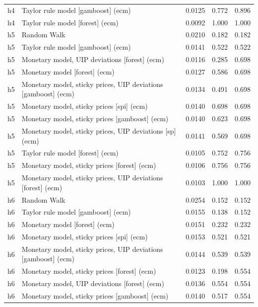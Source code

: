 \begin{ThreePartTable}
\begin{longtable}[t]{cp{5.5cm}ccc}
h4 & \raggedright Taylor rule model [gamboost] (ecm) & 0.0125 & 0.772 & 0.896\\
h4 & \raggedright Taylor rule model [forest] (ecm) & 0.0092 & 1.000 & 1.000\\
\addlinespace
h5 & \raggedright Random Walk & 0.0210 & 0.182 & 0.182\\
h5 & \raggedright Taylor rule model [gamboost] (ecm) & 0.0141 & 0.522 & 0.522\\
h5 & \raggedright Monetary model, UIP deviations [forest] (ecm) & 0.0116 & 0.285 & 0.698\\
h5 & \raggedright Monetary model [forest] (ecm) & 0.0127 & 0.586 & 0.698\\
h5 & \raggedright Monetary model, sticky prices, UIP deviations [gamboost] (ecm) & 0.0134 & 0.491 & 0.698\\
h5 & \raggedright Monetary model, sticky prices [spi] (ecm) & 0.0140 & 0.698 & 0.698\\
h5 & \raggedright Monetary model, sticky prices [gamboost] (ecm) & 0.0140 & 0.623 & 0.698\\
h5 & \raggedright Monetary model, sticky prices, UIP deviations [sp] (ecm) & 0.0141 & 0.569 & 0.698\\
h5 & \raggedright Taylor rule model [forest] (ecm) & 0.0105 & 0.752 & 0.756\\
h5 & \raggedright Monetary model, sticky prices [forest] (ecm) & 0.0106 & 0.756 & 0.756\\
h5 & \raggedright Monetary model, sticky prices, UIP deviations [forest] (ecm) & 0.0103 & 1.000 & 1.000\\
\addlinespace
h6 & \raggedright Random Walk & 0.0254 & 0.152 & 0.152\\
h6 & \raggedright Taylor rule model [gamboost] (ecm) & 0.0155 & 0.138 & 0.152\\
h6 & \raggedright Monetary model [forest] (ecm) & 0.0151 & 0.232 & 0.232\\
h6 & \raggedright Monetary model, sticky prices [spi] (ecm) & 0.0153 & 0.521 & 0.521\\
h6 & \raggedright Monetary model, sticky prices, UIP deviations [gamboost] (ecm) & 0.0144 & 0.539 & 0.539\\
h6 & \raggedright Monetary model, sticky prices [forest] (ecm) & 0.0123 & 0.198 & 0.554\\
h6 & \raggedright Monetary model, UIP deviations [forest] (ecm) & 0.0136 & 0.554 & 0.554\\
h6 & \raggedright Monetary model, sticky prices [gamboost] (ecm) & 0.0140 & 0.517 & 0.554\\

\end{longtable}
\end{ThreePartTable}

